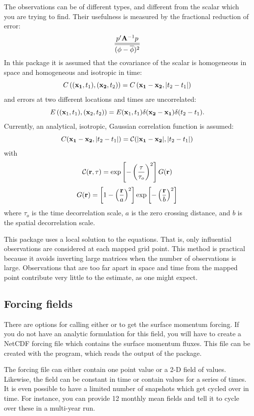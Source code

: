 The observations can be of different types, and different from the
scalar which you are trying to find.  Their usefulness is measured
by the fractional reduction of error:
\[
    {p'{\bf A}^{-1} p \over \overline{(\phi - \overline{\phi})^2}}
\]
In this package it is assumed that the covariance of the scalar is
homogeneous in space and homogeneous and isotropic in time:
\[
   C \left( ({\bf x_1}, t_1), ({\bf x_2}, t_2) \right) = 
   C \left( {\bf x_1 - x_2}, \left| t_2 - t_1 \right| \right)
\]
and errors at two different locations and times are uncorrelated:
\[
   E \left( ({\bf x}_1, t_1), ({\bf x}_2, t_2) \right) =
   E ({\bf x}_1, t_1) \delta ({\bf x_2 - x_1}) \delta(t_2 - t_1) .
\]
Currently, an analytical, isotropic, Gaussian correlation function is
assumed:
\[
    C({ \bf x_1 - x_2}, |t_2 - t_1| ) =
    {\cal C} ( |{ \bf x_1 - x_2}|, |t_2 - t_1| )
\]
with
\[
    {\cal C} ({\bf r}, \tau) = \exp \left[ - \left({\tau \over \tau_o}
    \right) ^2 \right] G({\bf r})
\]
\[
    G({\bf r}) = \left[ 1 - \left({{\bf r} \over a} \right)^2 \right]
    \exp \left[-\left({{\bf r} \over b} \right)^2 \right]
\]
where $\tau_o$ is the time decorrelation scale, $a$ is the zero
crossing distance, and $b$ is the spatial decorrelation scale.

This package uses a local solution to the  equations.  That
is, only  influential observations are considered at each
mapped grid point.  This method is practical because it avoids
inverting large matrices when the number of observations is large.
Observations that are too far apart in space and time from the mapped
point contribute very little to the estimate, as one might expect.

\subsection{Forcing fields}
There are options for calling either  or
 to get the surface momentum forcing.  If you do not
have an analytic formulation for this field,  you will have to create a
NetCDF forcing file which contains the surface momentum fluxes. This
file can be created with the  program, which reads the
output of the  package.

The forcing file can
either contain one point value or a 2-D field of values.  Likewise, the
field can be constant in time or contain values for a series of times.
It is even possible to have a limited number of snapshots which get
cycled over in time.  For instance, you can provide 12 monthly mean
fields and tell it to cycle over these in a multi-year run.

